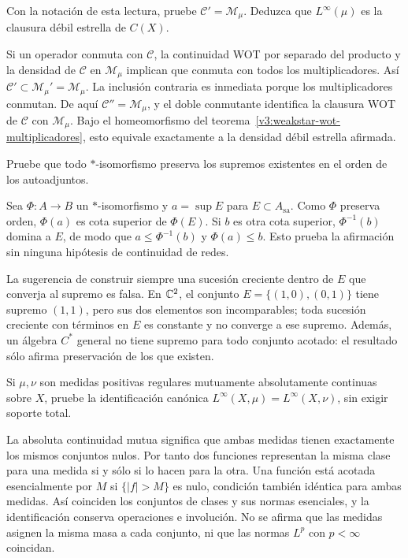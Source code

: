 \begin{ejercicio}\label{ej:v3-l35-3}
Con la notación de esta lectura, pruebe $\mathcal C'=\mathcal M_\mu$. Deduzca que $L^\infty(\mu)$ es la clausura débil estrella de $C(X)$.
\end{ejercicio}
\begin{solucion}
Si un operador conmuta con $\mathcal C$, la continuidad WOT por separado del producto y la densidad de $\mathcal C$ en $\mathcal M_\mu$ implican que conmuta con todos los multiplicadores. Así $\mathcal C'\subset\mathcal M_\mu'=\mathcal M_\mu$. La inclusión contraria es inmediata porque los multiplicadores conmutan. De aquí $\mathcal C''=\mathcal M_\mu$, y el doble conmutante identifica la clausura WOT de $\mathcal C$ con $\mathcal M_\mu$. Bajo el homeomorfismo del teorema~\ref{v3:weakstar-wot-multiplicadores}, esto equivale exactamente a la densidad débil estrella afirmada.
\end{solucion}

\begin{ejercicio}\label{ej:v3-l35-4}
Pruebe que todo $*$-isomorfismo preserva los supremos existentes en el orden de los autoadjuntos.
\end{ejercicio}
\begin{solucion}
Sea $\Phi:A\to B$ un $*$-isomorfismo y $a=\sup E$ para $E\subset A_{\mathrm{sa}}$. Como $\Phi$ preserva orden, $\Phi(a)$ es cota superior de $\Phi(E)$. Si $b$ es otra cota superior, $\Phi^{-1}(b)$ domina a $E$, de modo que $a\le\Phi^{-1}(b)$ y $\Phi(a)\le b$. Esto prueba la afirmación sin ninguna hipótesis de continuidad de redes.

La sugerencia de construir siempre una sucesión creciente dentro de $E$ que converja al supremo es falsa. En $\mathbb C^2$, el conjunto $E=\{(1,0),(0,1)\}$ tiene supremo $(1,1)$, pero sus dos elementos son incomparables; toda sucesión creciente con términos en $E$ es constante y no converge a ese supremo. Además, un álgebra $C^*$ general no tiene supremo para todo conjunto acotado: el resultado sólo afirma preservación de los que existen.
\end{solucion}

\begin{ejercicio}\label{ej:v3-l35-5}
Si $\mu,\nu$ son medidas positivas regulares mutuamente absolutamente continuas sobre $X$, pruebe la identificación canónica $L^\infty(X,\mu)=L^\infty(X,\nu)$, sin exigir soporte total.
\end{ejercicio}
\begin{solucion}
La absoluta continuidad mutua significa que ambas medidas tienen exactamente los mismos conjuntos nulos. Por tanto dos funciones representan la misma clase para una medida si y sólo si lo hacen para la otra. Una función está acotada esencialmente por $M$ si $\{|f|>M\}$ es nulo, condición también idéntica para ambas medidas. Así coinciden los conjuntos de clases y sus normas esenciales, y la identificación conserva operaciones e involución. No se afirma que las medidas asignen la misma masa a cada conjunto, ni que las normas $L^p$ con $p<\infty$ coincidan.
\end{solucion}
